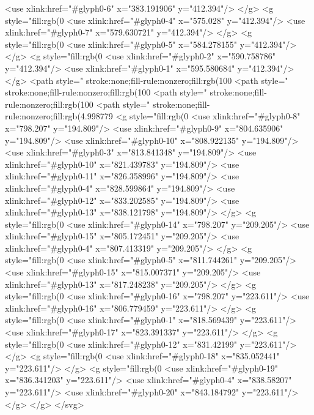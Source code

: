   <use xlink:href="#glyph0-6" x="383.191906" y="412.394"/>
</g>
<g style="fill:rgb(0%
  <use xlink:href="#glyph0-4" x="575.028" y="412.394"/>
  <use xlink:href="#glyph0-7" x="579.630721" y="412.394"/>
</g>
<g style="fill:rgb(0%
  <use xlink:href="#glyph0-5" x="584.278155" y="412.394"/>
</g>
<g style="fill:rgb(0%
  <use xlink:href="#glyph0-2" x="590.758786" y="412.394"/>
  <use xlink:href="#glyph0-1" x="595.580684" y="412.394"/>
</g>
<path style=" stroke:none;fill-rule:nonzero;fill:rgb(100%
<path style=" stroke:none;fill-rule:nonzero;fill:rgb(100%
<path style=" stroke:none;fill-rule:nonzero;fill:rgb(100%
<path style=" stroke:none;fill-rule:nonzero;fill:rgb(4.998779%
<g style="fill:rgb(0%
  <use xlink:href="#glyph0-8" x="798.207" y="194.809"/>
  <use xlink:href="#glyph0-9" x="804.635906" y="194.809"/>
  <use xlink:href="#glyph0-10" x="808.922135" y="194.809"/>
  <use xlink:href="#glyph0-3" x="813.841348" y="194.809"/>
  <use xlink:href="#glyph0-10" x="821.439783" y="194.809"/>
  <use xlink:href="#glyph0-11" x="826.358996" y="194.809"/>
  <use xlink:href="#glyph0-4" x="828.599864" y="194.809"/>
  <use xlink:href="#glyph0-12" x="833.202585" y="194.809"/>
  <use xlink:href="#glyph0-13" x="838.121798" y="194.809"/>
</g>
<g style="fill:rgb(0%
  <use xlink:href="#glyph0-14" x="798.207" y="209.205"/>
  <use xlink:href="#glyph0-15" x="805.172451" y="209.205"/>
  <use xlink:href="#glyph0-4" x="807.413319" y="209.205"/>
</g>
<g style="fill:rgb(0%
  <use xlink:href="#glyph0-5" x="811.744261" y="209.205"/>
  <use xlink:href="#glyph0-15" x="815.007371" y="209.205"/>
  <use xlink:href="#glyph0-13" x="817.248238" y="209.205"/>
</g>
<g style="fill:rgb(0%
  <use xlink:href="#glyph0-16" x="798.207" y="223.611"/>
  <use xlink:href="#glyph0-16" x="806.779459" y="223.611"/>
</g>
<g style="fill:rgb(0%
  <use xlink:href="#glyph0-1" x="818.569439" y="223.611"/>
  <use xlink:href="#glyph0-17" x="823.391337" y="223.611"/>
</g>
<g style="fill:rgb(0%
  <use xlink:href="#glyph0-12" x="831.42199" y="223.611"/>
</g>
<g style="fill:rgb(0%
  <use xlink:href="#glyph0-18" x="835.052441" y="223.611"/>
</g>
<g style="fill:rgb(0%
  <use xlink:href="#glyph0-19" x="836.341203" y="223.611"/>
  <use xlink:href="#glyph0-4" x="838.58207" y="223.611"/>
  <use xlink:href="#glyph0-20" x="843.184792" y="223.611"/>
</g>
</g>
</svg>
